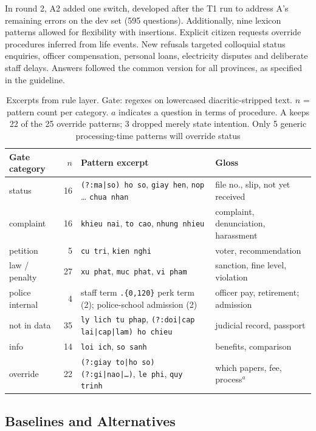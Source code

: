 \documentclass[runningheads]{llncs}
\begin{document}
{In round 2, A2 added one switch, developed after the T1 run to address A's remaining errors on the dev set (595 questions). Additionally, nine lexicon patterns allowed for flexibility with insertions. Explicit citizen requests override procedures inferred from life events. New refusals targeted colloquial status enquiries, officer compensation, personal loans, electricity disputes and deliberate staff delays. Answers followed the common version for all provinces, as specified in the guideline.}

\begin{table}[tb]
\caption{Excerpts from rule layer. Gate: regexes on lowercased diacritic-stripped text. $n$ = pattern count per category. $a$ indicates a question in terms of procedure. A keeps 22 of the 25 override patterns; 3 dropped merely state intention. Only 5 generic processing-time patterns will override status}\label{tab:rules}
\centering\scriptsize
\begin{tabular}{@{}l r p{5.6cm} p{3.6cm}@{}}
\toprule
Gate category & $n$ & Pattern excerpt & Gloss \\
\midrule
status & 16 & \texttt{(?:ma|so) ho so}, \texttt{giay hen}, \texttt{nop} \ldots{} \texttt{chua nhan} & file no., slip, not yet received \\
complaint & 16 & \texttt{khieu nai}, \texttt{to cao}, \texttt{nhung nhieu} & complaint, denunciation, harassment \\
petition & 5 & \texttt{cu tri}, \texttt{kien nghi} & voter, recommendation \\
law / penalty & 27 & \texttt{xu phat}, \texttt{muc phat}, \texttt{vi pham} & sanction, fine level, violation \\
police internal & 4 & staff term \texttt{.\{0,120\}} perk term (2); police-school admission (2) & officer pay, retirement; admission \\
not in data & 35 & \texttt{ly lich tu phap}, \texttt{(?:doi|cap lai|cap|lam) ho chieu} & judicial record, passport \\
info & 14 & \texttt{loi ich}, \texttt{so sanh} & benefits, comparison \\
override & 22 & \texttt{(?:giay to|ho so) (?:gi|nao|\ldots)}, \texttt{le phi}, \texttt{quy trinh} & which papers, fee, process$^a$ \\
\midrule

\bottomrule
\end{tabular}
\end{table}

\subsection{Baselines and Alternatives}
\end{document}
